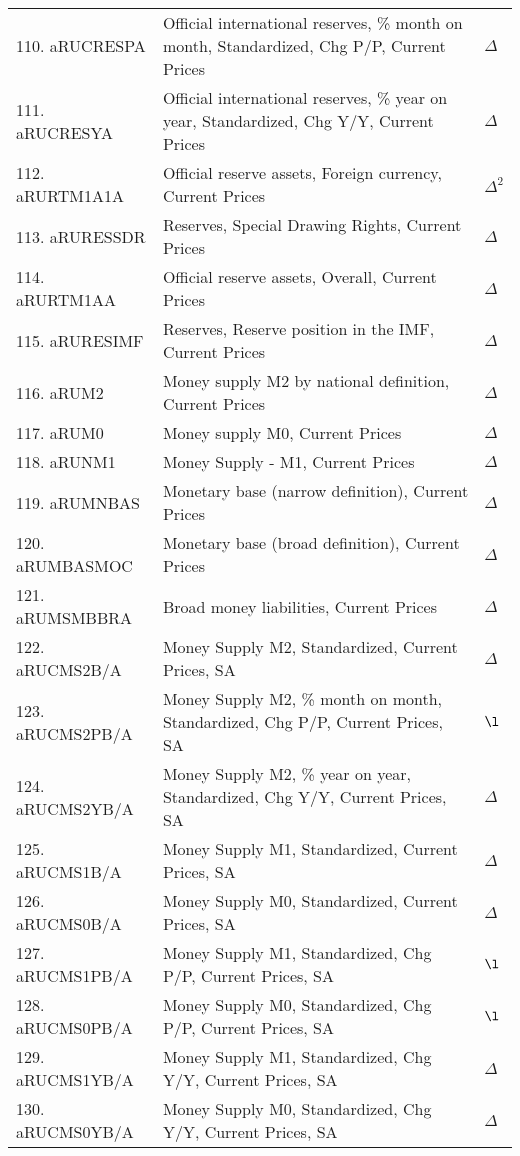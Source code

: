 \documentclass[a4paper, 14pt]{article}
\begin{document}
\begin{center}
\begin{longtable}{p{5.5cm} p{10cm} p{0.15cm}}
	110. aRUCRESPA &  Official international reserves, \% month on month, Standardized, Chg P/P, Current Prices & $\Delta$\\
	111. aRUCRESYA &  Official international reserves, \% year on year, Standardized, Chg Y/Y, Current Prices & $\Delta$\\
	112. aRURTM1A1A &  Official reserve assets, Foreign currency, Current Prices & $\Delta^2$\\
	113. aRURESSDR &  Reserves, Special Drawing Rights, Current Prices & $\Delta$\\
	114. aRURTM1AA &  Official reserve assets, Overall, Current Prices & $\Delta$\\
	115. aRURESIMF &  Reserves, Reserve position in the IMF, Current Prices & $\Delta$\\
	116. aRUM2 &  Money supply M2 by national definition, Current Prices & $\Delta$\\
	117. aRUM0 &  Money supply M0, Current Prices & $\Delta$\\
	118. aRUNM1 &  Money Supply - M1, Current Prices & $\Delta$\\
	119. aRUMNBAS &  Monetary base (narrow definition), Current Prices & $\Delta$\\
	120. aRUMBASMOC &  Monetary base (broad definition), Current Prices & $\Delta$\\
	121. aRUMSMBBRA &  Broad money liabilities, Current Prices & $\Delta$\\
	122. aRUCMS2B/A &  Money Supply M2, Standardized, Current Prices, SA & $\Delta$\\
	123. aRUCMS2PB/A &  Money Supply M2, \% month on month, Standardized, Chg P/P, Current Prices, SA & $\l$\\
	124. aRUCMS2YB/A &  Money Supply M2, \% year on year, Standardized, Chg Y/Y, Current Prices, SA & $\Delta$\\
	125. aRUCMS1B/A &  Money Supply M1, Standardized, Current Prices, SA & $\Delta$\\
	126. aRUCMS0B/A &  Money Supply M0, Standardized, Current Prices, SA & $\Delta$\\
	127. aRUCMS1PB/A &  Money Supply M1, Standardized, Chg P/P, Current Prices, SA & $\l$\\
	128. aRUCMS0PB/A &  Money Supply M0, Standardized, Chg P/P, Current Prices, SA & $\l$\\
	129. aRUCMS1YB/A &  Money Supply M1, Standardized, Chg Y/Y, Current Prices, SA & $\Delta$\\
	130. aRUCMS0YB/A &  Money Supply M0, Standardized, Chg Y/Y, Current Prices, SA & $\Delta$\\

\end{longtable}
\end{center}
\end{document}
